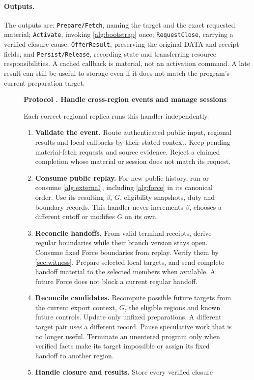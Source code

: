 \documentclass[11pt,a4paper]{article}
\newcounter{protocol}
\newenvironment{protocol}[3][htbp]{\begin{figure}[#1]\refstepcounter{protocol}\label{#2}
\begin{mdframed}[linewidth=.6pt,skipabove=0pt,skipbelow=0pt,
innertopmargin=7pt,innerbottommargin=7pt]\small
\textbf{Protocol \theprotocol. #3}\par\smallskip}{\end{mdframed}\end{figure}}
\begin{document}
\paragraph{Outputs.}
The outputs are:
\texttt{Prepare/Fetch}, naming the target and the exact requested
material; \texttt{Activate}, invoking \cref{alg:bootstrap} once;
\texttt{RequestClose}, carrying a verified closure cause;
\texttt{OfferResult}, preserving the original DATA and receipt fields;
and \texttt{Persist/Release}, recording state and transferring resource
responsibilities. A cached callback is material, not an activation
command. A late result can still be useful to storage even if it does not
match the program's current preparation target.

\begin{protocol}[H]{alg:rotation}{Handle cross-region events and manage sessions}
Each correct regional replica runs this handler independently.
\begin{enumerate}[label=\textbf{\arabic*)},itemsep=3pt]
\item \textbf{Validate the event.} Route authenticated public input,
regional results and local callbacks by their stated context. Keep
pending material-fetch requests and source evidence. Reject a claimed
completion whose material or session does not match its request.
\item \textbf{Consume public replay.} For new public history, run or
consume \cref{alg:external}, including \cref{alg:force} in its canonical
order. Use its resulting $\beta$, $G$, eligibility snapshots, duty and
boundary records. This handler never increments $\beta$, chooses a
different cutoff or modifies $G$ on its own.
\item \textbf{Reconcile handoffs.} From valid terminal receipts, derive
regular boundaries while their branch version stays open. Consume fixed
Force boundaries from replay. Verify them by \cref{sec:witness}. Prepare
selected local targets, and send complete handoff material to the
selected members when available. A future Force does not block a current
regular handoff.
\item \textbf{Reconcile candidates.} Recompute possible future targets
from the current export context, $G$, the eligible regions and known
future controls. Update only unfixed preparations. A different target
pair uses a different record. Pause speculative work that is no longer
useful. Terminate an unentered program only when verified facts make its
target impossible or assign its fixed handoff to another region.
\item \textbf{Handle closure and results.} Store every verified closure

\end{enumerate}
\end{protocol}
\end{document}
